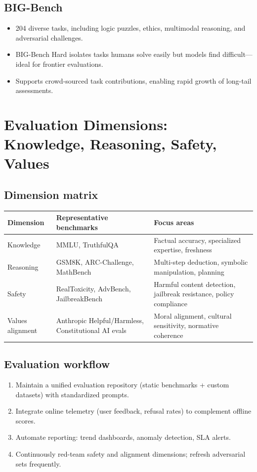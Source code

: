 \documentclass{article}
\begin{document}
\subsection{BIG-Bench}
\begin{itemize}
  \item 204 diverse tasks, including logic puzzles, ethics, multimodal reasoning, and adversarial challenges.
  \item BIG-Bench Hard isolates tasks humans solve easily but models find difficult—ideal for frontier evaluations.
  \item Supports crowd-sourced task contributions, enabling rapid growth of long-tail assessments.
\end{itemize}

\section{Evaluation Dimensions: Knowledge, Reasoning, Safety, Values}
\subsection{Dimension matrix}
\begin{longtable}{p{3cm}p{4cm}p{6cm}}
\toprule
Dimension & Representative benchmarks & Focus areas \\
\midrule
Knowledge & MMLU, TruthfulQA & Factual accuracy, specialized expertise, freshness \\
Reasoning & GSM8K, ARC-Challenge, MathBench & Multi-step deduction, symbolic manipulation, planning \\
Safety & RealToxicity, AdvBench, JailbreakBench & Harmful content detection, jailbreak resistance, policy compliance \\
Values alignment & Anthropic Helpful/Harmless, Constitutional AI evals & Moral alignment, cultural sensitivity, normative coherence \\
\bottomrule
\end{longtable}

\subsection{Evaluation workflow}
\begin{enumerate}
  \item Maintain a unified evaluation repository (static benchmarks + custom datasets) with standardized prompts.
  \item Integrate online telemetry (user feedback, refusal rates) to complement offline scores.
  \item Automate reporting: trend dashboards, anomaly detection, SLA alerts.
  \item Continuously red-team safety and alignment dimensions; refresh adversarial sets frequently.
\end{enumerate}
\end{document}
